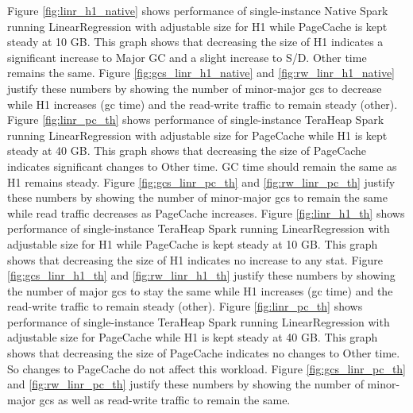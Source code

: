 Figure \ref{fig:linr_h1_native} shows performance of single-instance
Native Spark running LinearRegression with adjustable size for H1
while PageCache is kept steady at 10 GB. This graph shows that
decreasing the size of H1 indicates a significant increase to Major GC
and a slight increase to S/D. Other time remains the same. Figure
\ref{fig:gcs_linr_h1_native} and \ref{fig:rw_linr_h1_native} justify
these numbers by showing the number of minor-major gcs to decrease
while H1 increases (gc time) and the read-write traffic to remain
steady (other). Figure \ref{fig:linr_pc_th} shows performance of
single-instance TeraHeap Spark running LinearRegression with
adjustable size for PageCache while H1 is kept steady at 40 GB. This
graph shows that decreasing the size of PageCache indicates
significant changes to Other time. GC time should remain the same as
H1 remains steady. Figure \ref{fig:gcs_linr_pc_th} and
\ref{fig:rw_linr_pc_th} justify these numbers by showing the number of
minor-major gcs to remain the same while read traffic decreases as
PageCache increases. Figure \ref{fig:linr_h1_th} shows performance of
single-instance TeraHeap Spark running LinearRegression with
adjustable size for H1 while PageCache is kept steady at 10 GB. This
graph shows that decreasing the size of H1 indicates no increase to
any stat. Figure \ref{fig:gcs_linr_h1_th} and \ref{fig:rw_linr_h1_th}
justify these numbers by showing the number of major gcs to stay the
same while H1 increases (gc time) and the read-write traffic to remain
steady (other). Figure \ref{fig:linr_pc_th} shows performance of
single-instance TeraHeap Spark running LinearRegression with
adjustable size for PageCache while H1 is kept steady at 40 GB. This
graph shows that decreasing the size of PageCache indicates no changes
to Other time. So changes to PageCache do not affect this workload.
Figure \ref{fig:gcs_linr_pc_th} and \ref{fig:rw_linr_pc_th} justify
these numbers by showing the number of minor-major gcs as well as
read-write traffic to remain the same.

